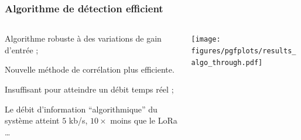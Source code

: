 \documentclass[../main.tex]{subfiles}
\begin{document}
\begin{frame}
  \frametitle{Algorithme de détection efficient}
  \begin{columns}
    \begin{column}{.4\linewidth}
      \begin{ctrlitemize}{.5 em}
        \item Algorithme robuste à des variations de gain d'entrée ;
        \item Nouvelle méthode de corrélation plus efficiente\footnotemark.
      \end{ctrlitemize} \vspace{1.5 em}

      \begin{ctrlitemize}{.5 em}
        \item Insuffisant pour atteindre un débit temps réel ;
        \item Le débit d'information ``algorithmique'' du système atteint $5$ kb/s, $10\times$ moins que le LoRa \dots
      \end{ctrlitemize}
    \end{column}
    \begin{column}{.4\linewidth}
      \centering
      \texttt{[image: figures/pgfplots/results\_algo\_through.pdf]}
    \end{column}
  \end{columns}
\end{frame}
\end{document}
